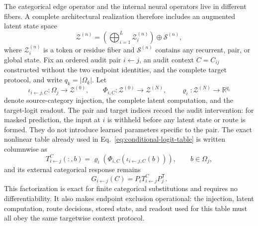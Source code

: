\documentclass[10pt]{article}
\theoremstyle{definition}
\theoremstyle{remark}
\begin{document}
The categorical edge operator and the internal neural operators live in different fibers.  A
complete architectural realization therefore includes an augmented latent state space
\begin{equation}
\mathscr Z^{(n)}
=\left(\bigoplus_{i=1}^{L}\mathscr Z_i^{(n)}\right)\oplus\mathscr S^{(n)},
\label{eq:augmented-latent-state}
\end{equation}
where $\mathscr Z_i^{(n)}$ is a token or residue fiber and $\mathscr S^{(n)}$ contains any recurrent,
pair, or global state.  Fix an ordered audit pair $i\leftarrow j$, an audit context $C=C_{ij}$
constructed without the two endpoint identities, and the complete target protocol, and write
$q_k=|\Omega_k|$.  Let
\begin{equation}
\iota_{i\leftarrow j,C}:\Omega_j\longrightarrow\mathscr Z^{(0)},
\qquad
\Phi_{i,C}:\mathscr Z^{(0)}\longrightarrow\mathscr Z^{(N)},
\qquad
\varrho_i:\mathscr Z^{(N)}\longrightarrow\mathbb R^{q_i}
\label{eq:encoder-transport-readout-maps}
\end{equation}
denote source-category injection, the complete latent computation, and the target-logit readout.
The pair and target indices record the audit intervention: for masked prediction, the input at $i$
is withheld before any latent state or route is formed.  They do not introduce learned parameters
specific to the pair.  The exact nonlinear table already used in
Eq.~\ref{eq:conditional-logit-table} is written columnwise as
\begin{equation}
T_{i\leftarrow j}^{C}(:,b)
=\varrho_i\!\left(\Phi_{i,C}(\iota_{i\leftarrow j,C}(b))\right),
\qquad b\in\Omega_j,
\label{eq:exact-encoder-transport-readout-table}
\end{equation}
and its external categorical response remains
\begin{equation}
G_{i\leftarrow j}(C)
=P_iT_{i\leftarrow j}^{C}P_j^{\mathsf T}.
\label{eq:exact-etr-response}
\end{equation}
This factorization is exact for finite categorical substitutions and requires no differentiability.
It also makes endpoint exclusion operational: the injection, latent computation, route decisions,
stored state, and readout used for this table must all obey the same targetwise context protocol.
\end{document}
